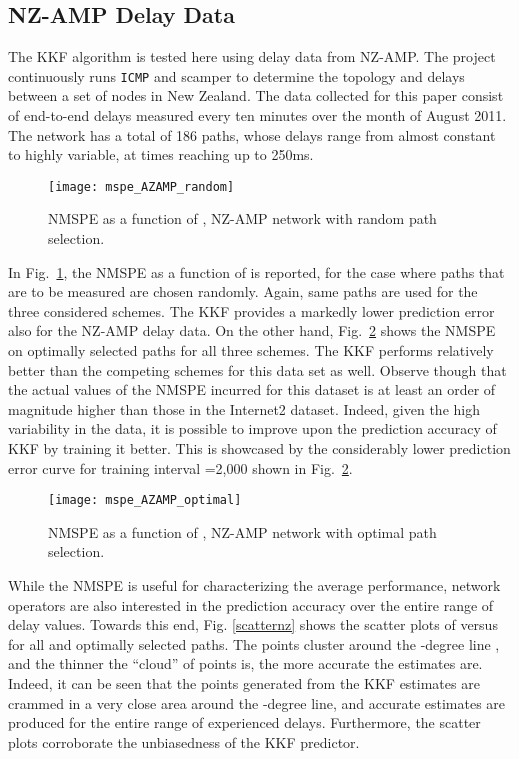\documentclass[draftcls,onecolumn,12pt]{IEEEtran}
\newlength \figwidth
\theoremstyle{plain}\newtheorem{thm}{Theorem}
\theoremstyle{definition}
\theoremstyle{remark}
\begin{document}
   
 
 
\subsection{NZ-AMP Delay Data}
The KKF algorithm is tested here using delay data from NZ-AMP. 
The project continuously runs \texttt{ICMP} and scamper to determine the topology and delays between a set of nodes in New Zealand. The data collected for this paper consist of end-to-end delays measured every ten minutes over the month of August 2011. The network has a total of 186 paths, whose delays range from almost constant to highly variable, at times reaching up to 250ms.

\begin{figure}
\centering
\texttt{[image: mspe\_AZAMP\_random]}
\caption{NMSPE as a function of , NZ-AMP network with random path selection.}
\label{mspeNZrandom}
\end{figure}




In Fig.~\ref{mspeNZrandom}, the NMSPE as a function of  is reported, for the case where paths that are to be measured are chosen randomly. Again, same paths are used for the three considered  schemes. The KKF provides a markedly lower prediction error also for the NZ-AMP delay data. 
On the other hand, Fig.~\ref{mspeNZoptimal} shows the NMSPE on optimally selected paths for all three schemes. 
The KKF performs relatively better than the competing schemes for this data set as well.
Observe though that the actual values of the NMSPE incurred for this dataset is at least an order of magnitude higher than those in the Internet2 dataset. 
Indeed, given the high variability in the data, it is possible to improve upon the prediction accuracy of KKF by training it better. 
This is showcased by the considerably lower prediction error curve for training interval =2,000 shown in Fig.~\ref{mspeNZoptimal}.

\begin{figure}
\centering
\texttt{[image: mspe\_AZAMP\_optimal]}
\caption{NMSPE as a function of , NZ-AMP network with optimal path selection.}
\label{mspeNZoptimal}
\end{figure}


While the NMSPE is useful for characterizing the average performance, network operators are also interested in the prediction accuracy over the entire range of delay values.
Towards this end, Fig. \ref{scatternz} shows the scatter plots of  versus  for all  and  optimally selected paths.
The points cluster around the -degree line , and the thinner the ``cloud'' of points is, the more accurate the estimates are. Indeed, it can be seen that the points generated from the KKF estimates are crammed in a very close area around the -degree line, and accurate estimates are produced for the entire range of experienced delays.  Furthermore, the scatter plots corroborate the unbiasedness of the KKF predictor.  
\end{document}
